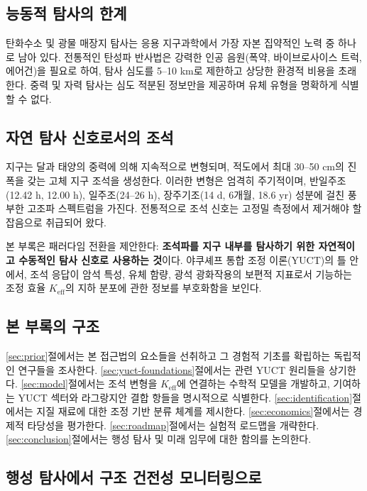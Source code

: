 \documentclass[12pt,a4paper]{article}
\theoremstyle{remark}
\newcommand{\Keff}{K_{\mathrm{eff}}}
\begin{document}
	\subsection{능동적 탐사의 한계}
	
	탄화수소 및 광물 매장지 탐사는 응용 지구과학에서 가장 자본 집약적인 노력 중 하나로 남아 있다. 전통적인 탄성파 반사법은 강력한 인공 음원(폭약, 바이브로사이스 트럭, 에어건)을 필요로 하여, 탐사 심도를 5–10 km로 제한하고 상당한 환경적 비용을 초래한다. 중력 및 자력 탐사는 심도 적분된 정보만을 제공하며 유체 유형을 명확하게 식별할 수 없다.
	
	\subsection{자연 탐사 신호로서의 조석}
	
	지구는 달과 태양의 중력에 의해 지속적으로 변형되며, 적도에서 최대 30–50 cm의 진폭을 갖는 고체 지구 조석을 생성한다. 이러한 변형은 엄격히 주기적이며, 반일주조(12.42 h, 12.00 h), 일주조(24–26 h), 장주기조(14 d, 6개월, 18.6 yr) 성분에 걸친 풍부한 고조파 스펙트럼을 가진다. 전통적으로 조석 신호는 고정밀 측정에서 제거해야 할 잡음으로 취급되어 왔다.
	
	본 부록은 패러다임 전환을 제안한다: \textbf{조석파를 지구 내부를 탐사하기 위한 자연적이고 수동적인 탐사 신호로 사용하는 것}이다. 야쿠셰프 통합 조정 이론(YUCT)의 틀 안에서, 조석 응답이 암석 특성, 유체 함량, 광석 광화작용의 보편적 지표로서 기능하는 조정 효율 \(\Keff\)의 지하 분포에 관한 정보를 부호화함을 보인다.
	
	\subsection{본 부록의 구조}
	
	\ref{sec:prior}절에서는 본 접근법의 요소들을 선취하고 그 경험적 기초를 확립하는 독립적인 연구들을 조사한다. \ref{sec:yuct-foundations}절에서는 관련 YUCT 원리들을 상기한다. \ref{sec:model}절에서는 조석 변형을 \(\Keff\)에 연결하는 수학적 모델을 개발하고, 기여하는 YUCT 섹터와 라그랑지안 결합 항들을 명시적으로 식별한다. \ref{sec:identification}절에서는 지질 재료에 대한 조정 기반 분류 체계를 제시한다. \ref{sec:economics}절에서는 경제적 타당성을 평가한다. \ref{sec:roadmap}절에서는 실험적 로드맵을 개략한다. \ref{sec:conclusion}절에서는 행성 탐사 및 미래 임무에 대한 함의를 논의한다.
	
	\subsection{행성 탐사에서 구조 건전성 모니터링으로}
	\label{sec:beyond-geophysics}
	
\end{document}
